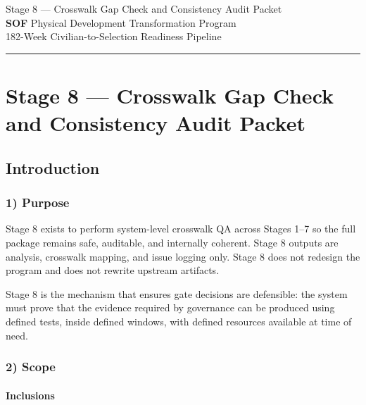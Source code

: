 \documentclass[10pt]{article}
\newcommand{\TitleLine}{\textcolor{StageBlue}{\rule{0.98\linewidth}{0.95pt}}}
\begin{document}
\begin{tcolorbox}
\begin{center}
Stage 8 — Crosswalk Gap Check and Consistency Audit Packet\\[0.35em]
\textbf{SOF} Physical Development Transformation Program\\[0.25em]
182-Week Civilian-to-Selection Readiness Pipeline\\[0.65em]
\TitleLine
\end{center}
\end{tcolorbox}

\vspace{0.35em}

\section*{Stage 8 — Crosswalk Gap Check and Consistency Audit Packet}
{}

\subsection*{Introduction}
{}

\subsubsection*{1) Purpose}

Stage 8 exists to perform system-level crosswalk QA across Stages 1–7 so the full package remains safe, auditable, and internally coherent. Stage 8 outputs are analysis, crosswalk mapping, and issue logging only. Stage 8 does not redesign the program and does not rewrite upstream artifacts.

Stage 8 is the mechanism that ensures gate decisions are defensible: the system must prove that the evidence required by governance can be produced using defined tests, inside defined windows, with defined resources available at time of need.

\subsubsection*{2) Scope}

\paragraph*{Inclusions}
\end{document}
